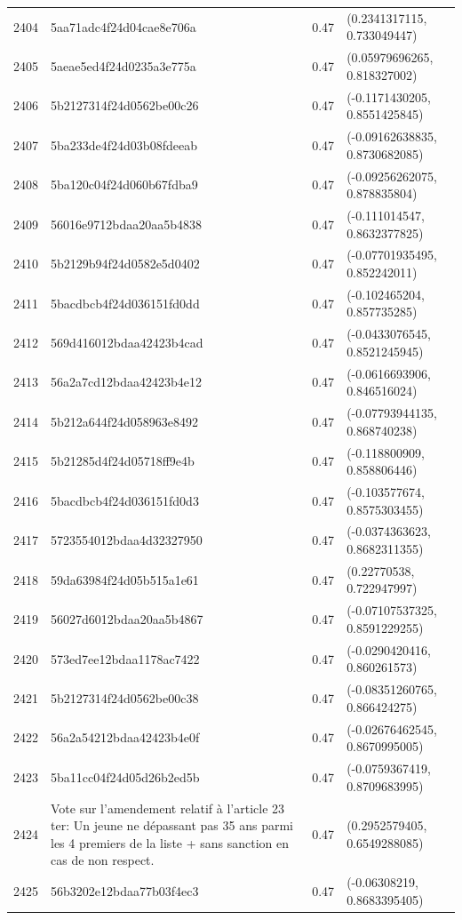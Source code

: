 \begin{table}[ht]
\begin{tabular}{rlrl}
  2404 & 5aa71adc4f24d04cae8e706a & 0.47 & (0.2341317115, 0.733049447) \\ 
  2405 & 5aeae5ed4f24d0235a3e775a & 0.47 & (0.05979696265, 0.818327002) \\ 
  2406 & 5b2127314f24d0562be00c26 & 0.47 & (-0.1171430205, 0.8551425845) \\ 
  2407 & 5ba233de4f24d03b08fdeeab & 0.47 & (-0.09162638835, 0.8730682085) \\ 
  2408 & 5ba120c04f24d060b67fdba9 & 0.47 & (-0.09256262075, 0.878835804) \\ 
  2409 & 56016e9712bdaa20aa5b4838 & 0.47 & (-0.111014547, 0.8632377825) \\ 
  2410 & 5b2129b94f24d0582e5d0402 & 0.47 & (-0.07701935495, 0.852242011) \\ 
  2411 & 5bacdbcb4f24d036151fd0dd & 0.47 & (-0.102465204, 0.857735285) \\ 
  2412 & 569d416012bdaa42423b4cad & 0.47 & (-0.0433076545, 0.8521245945) \\ 
  2413 & 56a2a7cd12bdaa42423b4e12 & 0.47 & (-0.0616693906, 0.846516024) \\ 
  2414 & 5b212a644f24d058963e8492 & 0.47 & (-0.07793944135, 0.868740238) \\ 
  2415 & 5b21285d4f24d05718ff9e4b & 0.47 & (-0.118800909, 0.858806446) \\ 
  2416 & 5bacdbcb4f24d036151fd0d3 & 0.47 & (-0.103577674, 0.8575303455) \\ 
  2417 & 5723554012bdaa4d32327950 & 0.47 & (-0.0374363623, 0.8682311355) \\ 
  2418 & 59da63984f24d05b515a1e61 & 0.47 & (0.22770538, 0.722947997) \\ 
  2419 & 56027d6012bdaa20aa5b4867 & 0.47 & (-0.07107537325, 0.8591229255) \\ 
  2420 & 573ed7ee12bdaa1178ac7422 & 0.47 & (-0.0290420416, 0.860261573) \\ 
  2421 & 5b2127314f24d0562be00c38 & 0.47 & (-0.08351260765, 0.866424275) \\ 
  2422 & 56a2a54212bdaa42423b4e0f & 0.47 & (-0.02676462545, 0.8670995005) \\ 
  2423 & 5ba11cc04f24d05d26b2ed5b & 0.47 & (-0.0759367419, 0.8709683995) \\ 
  2424 & Vote sur l'amendement relatif à l'article 23 ter: Un jeune ne dépassant pas 35 ans parmi les 4 premiers de la liste + sans sanction en cas de non respect. & 0.47 & (0.2952579405, 0.6549288085) \\ 
  2425 & 56b3202e12bdaa77b03f4ec3 & 0.47 & (-0.06308219, 0.8683395405) \\ 

\end{tabular}
\end{table}

